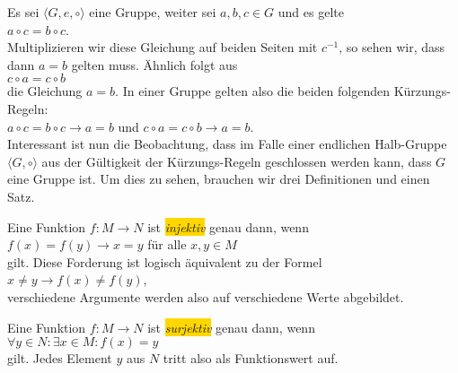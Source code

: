 \remark Es sei $\langle G, e, \circ \rangle$ eine Gruppe, weiter sei $a,b,c \in G$ und es gelte
\\[0.2cm]
\hspace*{1.3cm} $a \circ c = b \circ c$.
\\[0.2cm]
Multiplizieren wir diese Gleichung auf beiden Seiten mit $c^{-1}$, so sehen wir, dass dann $a = b$ gelten
muss.  \"{A}hnlich folgt aus
\\[0.2cm]
\hspace*{1.3cm} $c \circ a = c \circ b$
\\[0.2cm]
die Gleichung $a = b$.  In einer Gruppe gelten also die beiden folgenden K\"{u}rzungs-Regeln:
\\[0.2cm]
\hspace*{1.3cm} 
$a \circ c = b \circ c \rightarrow a = b$ \quad und \quad
$c \circ a = c \circ b \rightarrow a = b$.
\\[0.2cm]
Interessant ist nun die Beobachtung, dass im Falle einer endlichen Halb-Gruppe 
$\langle G, \circ \rangle$ aus der G\"{u}ltigkeit der  
K\"{u}rzungs-Regeln geschlossen werden kann, dass $G$ eine Gruppe ist.
Um dies zu sehen, brauchen wir drei Definitionen und einen Satz.
\eox

\begin{Definition}[injektiv]
  Eine Funktion $f: M \rightarrow N$ ist \colorbox{gold}{\emph{injektiv}} genau dann, wenn
  \\[0.2cm]
  \hspace*{1.3cm}
  $f(x) = f(y) \rightarrow x = y$ \quad f\"{u}r alle $x,y\in M$ 
  \\[0.2cm]
  gilt.  Diese Forderung ist logisch \"{a}quivalent zu der Formel
  \\[0.2cm]
  \hspace*{1.3cm}
  $x \not= y \rightarrow f(x) \not= f(y)$,
  \\[0.2cm]
  verschiedene Argumente werden also auf verschiedene Werte abgebildet.
\eox
\end{Definition}

\begin{Definition}[surjektiv]
  Eine Funktion $f: M \rightarrow N$ ist \colorbox{gold}{\emph{surjektiv}} genau dann, wenn
  \\[0.2cm]
  \hspace*{1.3cm}
  $\forall y \in N: \exists x \in M: f(x) = y$ 
  \\[0.2cm]
  gilt.  Jedes Element $y$ aus $N$ tritt also als Funktionswert auf.
\eox
\end{Definition}


